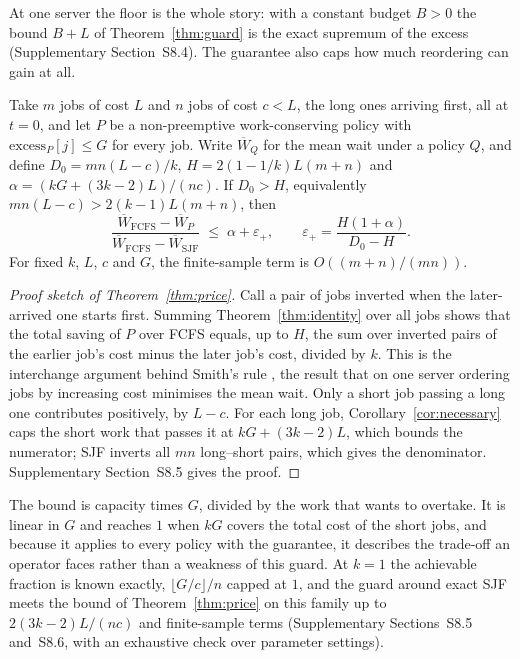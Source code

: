 At one server the floor is the whole story: with a constant budget $B > 0$ the bound $B+L$
of Theorem~\ref{thm:guard} is the exact supremum of the excess (Supplementary
Section~S8.4). The guarantee also caps how much reordering can gain at all.

\begin{theorem}
\label{thm:price}
Take $m$ jobs of cost $L$ and $n$ jobs of cost $c < L$, the long ones arriving first, all
at $t = 0$, and let $P$ be a non-preemptive work-conserving policy with
$\mathrm{excess}_P[j] \le G$ for every job. Write $\overline{W}_Q$ for the mean wait under
a policy $Q$, and define $D_0 = mn(L-c)/k$,
$H = 2(1-1/k)L(m+n)$ and $\alpha = (kG + (3k-2)L)/(nc)$. If $D_0 > H$, equivalently
$mn(L-c) > 2(k-1)L(m+n)$, then
\begin{equation}
  \frac{\overline{W}_{\mathrm{FCFS}} - \overline{W}_{P}}
       {\overline{W}_{\mathrm{FCFS}} - \overline{W}_{\mathrm{SJF}}}
  \;\le\; \alpha + \varepsilon_+,
  \qquad
  \varepsilon_+ = \frac{H(1+\alpha)}{D_0 - H}.
  \label{eq:price}
\end{equation}
For fixed $k$, $L$, $c$ and $G$, the finite-sample term is $O((m+n)/(mn))$.
\end{theorem}

\begin{proof}[Proof sketch of Theorem~\ref{thm:price}]
Call a pair of jobs inverted when the later-arrived one starts first. Summing
Theorem~\ref{thm:identity} over all jobs shows that the total saving of $P$ over FCFS equals,
up to $H$, the sum over inverted pairs of the earlier job's cost minus the later job's cost,
divided by $k$. This is the interchange argument behind Smith's rule \cite{smith1956}, the
result that on one server ordering jobs by increasing cost minimises the mean wait. Only a
short job passing a long one contributes positively, by $L - c$. For each long job,
Corollary~\ref{cor:necessary} caps the short work that passes it at $kG + (3k-2)L$, which
bounds the numerator; SJF inverts all $mn$ long--short pairs, which gives the denominator. Supplementary
Section~S8.5 gives the proof.
\end{proof}

The bound is capacity times $G$, divided by the work that wants to overtake. It is
linear in $G$ and reaches $1$ when $kG$ covers the total cost of the short jobs, and
because it applies to every policy with the guarantee, it describes the trade-off an
operator faces rather than a weakness of this guard. At $k = 1$ the achievable fraction is
known exactly, $\lfloor G/c \rfloor / n$ capped at $1$, and the guard around exact SJF
meets the bound of Theorem~\ref{thm:price} on this family up to $2(3k-2)L/(nc)$ and
finite-sample terms
(Supplementary Sections~S8.5 and~S8.6, with an exhaustive check over 
parameter settings).
